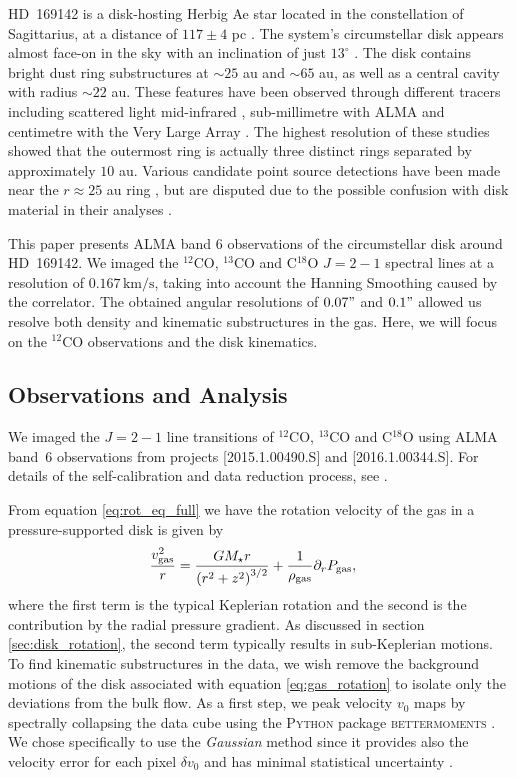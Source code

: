 HD~169142 is a disk-hosting Herbig Ae star located in the constellation of Sagittarius, at a distance of $117 \pm 4$ pc \citep{brown2016}.
The system's circumstellar disk appears almost face-on in the sky with an inclination of just $13^\circ$ \citep{raman2006,panic2008}.
The disk contains bright dust ring substructures at $\sim25$ au and $\sim65$ au, as well as a central cavity with radius $\sim22$ au.
These features have been observed through different tracers including scattered light \citep{quanz2013a,momose2015,pohl2017,bertrang2018} mid-infrared \citep{honda2012}, sub-millimetre with ALMA \citep{fedele2017,macias2019,perez2019} and centimetre with the Very Large Array \citep{osorio2014}.
The highest resolution of these studies showed that the outermost ring is actually three distinct rings separated by approximately $10$ au.
Various candidate point source detections have been made near the $r \approx 25$ au ring \citep{biller2014,reggiani2014,gratton2019}, but are disputed due to the possible confusion with disk material in their analyses \citep{ligi2018}.

This paper presents ALMA band 6 observations of the circumstellar disk around HD~169142.
We imaged the $^{12}$CO, $^{13}$CO and C$^{18}$O $J=2-1$ spectral lines at a resolution of $0.167 \, \mathrm{km/s}$, taking into account the Hanning Smoothing caused by the correlator.
The obtained angular resolutions of $0.07"$ and $0.1"$ allowed us resolve both density and kinematic substructures in the gas. Here, we will focus on the $^{12}$CO observations and the disk kinematics.

\subsection{Observations and Analysis}

We imaged the $J=2-1$ line transitions of $^{12}$CO, $^{13}$CO and C$^{18}$O using ALMA band~6 observations from projects [2015.1.00490.S] and [2016.1.00344.S].
For details of the self-calibration and data reduction process, see \citet{garg2022}.

From equation \ref{eq:rot_eq_full} we have the rotation velocity of the gas in a pressure-supported disk is given by 
\begin{align}
    \frac{v_{\rm gas}^2}{r} &= \frac{G M_\star r}{\left( r^2 + z^2  \right)^{3/2}} + \frac{1}{\rho_{\rm gas}} \partial_r P_{\rm gas}, \label{eq:gas_rotation}
\end{align}
where the first term is the typical Keplerian rotation and the second is the contribution by the radial pressure gradient.
As discussed in section \ref{sec:disk_rotation}, the second term typically results in sub-Keplerian motions.
To find kinematic substructures in the data, we wish remove the background motions of the disk associated with equation \ref{eq:gas_rotation} to isolate only the deviations from the bulk flow.
As a first step, we peak velocity $v_0$ maps by spectrally collapsing the data cube using the \textsc{Python} package \textsc{bettermoments} \citep{teague2018a}.
We chose specifically to use the \textit{Gaussian} method since it provides also the velocity error for each pixel $\delta v_0$ and has minimal statistical uncertainty \citep{yu2021}.

